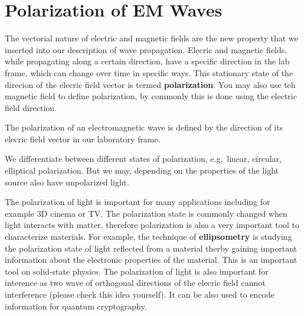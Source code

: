\documentclass[
  a4paper,
]{book}
\begin{document}
\chapter{Polarization of EM Waves}\label{polarization-of-em-waves}

The vectorial nature of electric and magnetic fields are the new
property that we inserted into our description of wave propagation.
Elecric and magnetic fields, while propagating along a certain
direction, have a specific direction in the lab frame, which can change
over time in specific ways. This stationary state of the direcion of the
elecric field vector is termed \textbf{polarization}. You may also use
teh magnetic field to define polarization, by commonly this is done
using the electric field direction.

\begin{tcolorbox}[enhanced jigsaw, coltitle=black, title=\textcolor{quarto-callout-note-color}{\faInfo}\hspace{0.5em}{Polarization of Electromagnetic Waves}, colframe=quarto-callout-note-color-frame, toprule=.15mm, opacitybacktitle=0.6, left=2mm, opacityback=0, breakable, toptitle=1mm, bottomtitle=1mm, leftrule=.75mm, arc=.35mm, titlerule=0mm, colbacktitle=quarto-callout-note-color!10!white, rightrule=.15mm, bottomrule=.15mm, colback=white]

The polarization of an electromagnetic wave is defined by the direction
of its elecric field vector in our laboratory frame.

\end{tcolorbox}

We differentiate between different states of polarization, e.g.~linear,
circular, elliptical polarization. But we may, depending on the
properties of the light source also have unpolarized light.

The polarization of light is important for many applications including
for example 3D cinema or TV. The polarization state is commonly changed
when light interacts with matter, therefore polarization is also a very
important tool to characterize materials. For example, the technique of
\textbf{ellipsometry} is studying the polarization state of light
reflected from a material therby gaining important information about the
electronic properties of the material. This is an important tool on
solid-state physics. The polarization of light is also important for
interence as two wave of orthogonal directions of the elecric field
cannot interference (please check this idea yourself). It can be also
used to encode information for quantum cryptography.
\end{document}
